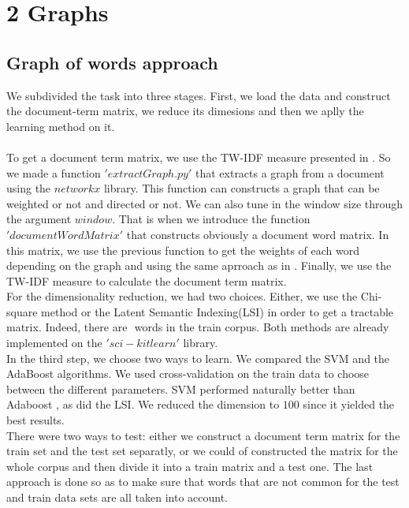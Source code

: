 \section*{2 Graphs}
\subsection*{Graph of words approach}

We subdivided the task into three stages. First, we load the data and construct the document-term matrix, we reduce its dimesions and then we aplly the learning method on it.~\\
~\\
To get a document term matrix, we use the TW-IDF measure presented in \cite{rousseau2013graph}. So we made a function $'extractGraph.py'$ that extracts a graph from a document using the $networkx$ library. This function can constructs a graph that can be weighted or not and directed or not. We can also tune in the window size through the argument $window$. That is when we introduce the function $'documentWordMatrix'$ that constructs obviously a document word matrix. In this matrix, we use the previous function to get the weights of each word depending on the graph and using the same aprroach as in \cite{rousseau2013graph}. Finally, we use the TW-IDF measure to calculate the document term matrix.\\

For the dimensionality reduction, we had two choices. Either, we use the Chi-square method or the Latent Semantic Indexing(LSI) in order to get a tractable matrix. Indeed, there are $ $ words in the train corpus. Both methods are already implemented on the $'sci-kit learn'$ library. \\

In the third step, we choose two ways to learn. We compared the SVM and the AdaBoost algorithms. We used cross-validation on the train data to choose between the different parameters. SVM performed naturally better than Adaboost , as did the LSI. We reduced the dimension to $100$ since it yielded the best results.\\

There were two ways to test: either we construct a document term matrix for the train set and the test set separatly, or we could of constructed the matrix for the whole corpus and then divide it into a train matrix and a test one. The last approach is done so as to make sure that words that are not common for the test and train data sets are all taken into account.\\

